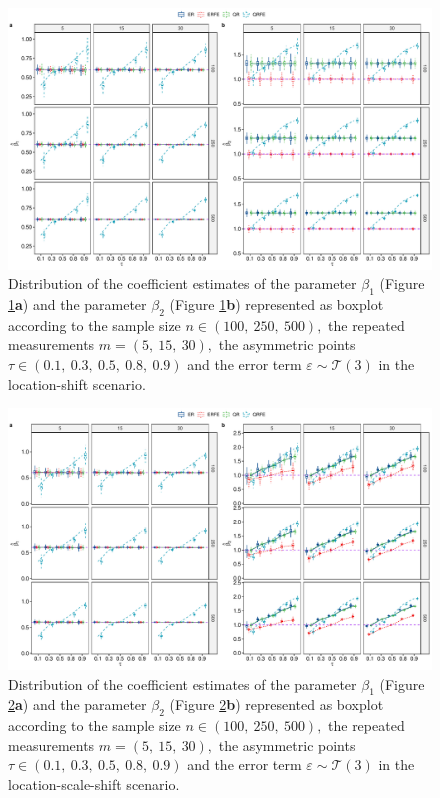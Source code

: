 \documentclass[15pt,a4paper]{article}
\begin{document}
\begin{center}
\begin{figure}[H]
\includegraphics[width=0.8\linewidth]{Graph_supp/gstud1_erfe}
 \caption{Distribution of the coefficient estimates of the parameter $\beta_1$ (Figure \ref{fig:gstud1_erfe}\textbf{a}) and the parameter $\beta_2$ (Figure \ref{fig:gstud1_erfe}\textbf{b}) represented as boxplot according to the sample size $n\in(100,  \ 250,  \ 500),$ the repeated measurements $m=(5,\ 15,\ 30),$ the asymmetric points $\tau\in (0.1,  \ 0.3,  \  0.5, \  0.8,\ 0.9)$ and the error term $\varepsilon\sim\mathcal{T}(3)$ in the location-shift scenario.}\label{fig:gstud1_erfe}
\end{figure}
\end{center}

\begin{center}
\begin{figure}[H]
\includegraphics[width=0.8\linewidth]{Graph_supp/gstud2_erfe}
 \caption{Distribution of the coefficient estimates of the parameter $\beta_1$ (Figure \ref{fig:gstud2_erfe}\textbf{a}) and the parameter $\beta_2$ (Figure \ref{fig:gstud2_erfe}\textbf{b}) represented as boxplot according to the sample size $n\in(100,  \ 250,  \ 500),$ the repeated measurements $m=(5,\ 15,\ 30),$ the asymmetric points $\tau\in (0.1,  \ 0.3,  \  0.5, \  0.8,\ 0.9)$ and the error term $\varepsilon\sim\mathcal{T}(3)$ in the location-scale-shift scenario.}\label{fig:gstud2_erfe}
\end{figure}
\end{center} 
\end{document}
